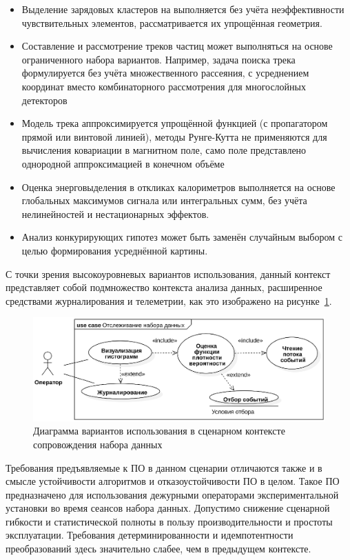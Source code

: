 \begin{itemize}
    \item Выделение зарядовых кластеров на выполняется без учёта
    неэффективности чувствительных элементов, рассматривается
    их упрощённая геометрия.
    \item Составление и рассмотрение треков частиц может выполняться
    на основе ограниченного набора вариантов. Например, задача поиска
    трека формулируется без учёта множественного рассеяния, с
    усреднением координат вместо комбинаторного рассмотрения для
    многослойных детекторов
    \item Модель трека аппроксимируется упрощённой функцией
    (с пропагатором прямой или винтовой линией),
    методы Рунге-Кутта не применяются для вычисления ковариации
    в магнитном поле, само поле представлено однородной аппроксимацией
    в конечном объёме
    \item Оценка энерговыделения в откликах калориметров выполняется
    на основе глобальных максимумов сигнала или интегральных сумм,
    без учёта нелинейностей и нестационарных
    эффектов.
    \item Анализ конкурирующих гипотез может быть заменён случайным
    выбором с целью формирования усреднённой картины.
\end{itemize}

С точки зрения высокоуровневых вариантов использования, данный контекст
представляет собой подмножество контекста анализа данных,
расширенное средствами журналирования и телеметрии, как это изображено
на рисунке~\ref{fig:online-monitoring-usecases-main}.

\begin{figure}[ht!]
    \centering
    \includegraphics[width=0.95\linewidth]{images/usecases/onlineMonitoring.eps}
    \caption{Диаграмма вариантов использования в сценарном контексте сопровождения набора данных}
    \label{fig:online-monitoring-usecases-main}
\end{figure}

Требования предъявляемые к ПО в данном сценарии отличаются также
и в смысле устойчивости алгоритмов и отказоустойчивости ПО в целом.
Такое ПО предназначено для использования дежурными операторами
экспериментальной установки во время сеансов набора данных. Допустимо
снижение сценарной гибкости и статистической полноты в пользу
производительности и простоты эксплуатации. Требования
детерминированности и идемпотентности преобразований здесь
значительно слабее, чем в предыдущем контексте.

